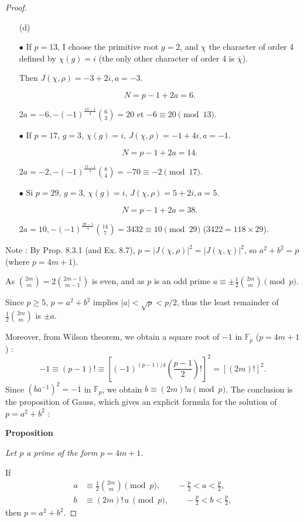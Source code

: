 \documentclass[11pt,a4paper]{article}
\newcommand{\F}{\mathbb{F}}
\begin{document}
{\begin{proof}
\begin{enumerate}
$$2a \equiv - (-1)^{\frac{p-1}{4}}\binom{\frac{p-1}{2}}{\frac{p-1}{4}}\ \pmod p.$$


\item[(d)] 

 $\bullet$ If $p=13$, I choose the primitive root $g = \overline{2}$, and $\chi$ the character of order 4 defined by $\chi(g) = i$ (the only other character of order 4 is $\overline{\chi}$).
 
Then $J(\chi,\rho) = -3+2i, a = -3$.

$$N=p-1+2a=6.$$

$2a=-6, -(-1)^{\frac{13-1}{4}} \binom{6}{3} = 20$ et $-6\equiv20\pmod {13}$.

$\bullet$ If $p=17$, $g = 3$,  $\chi(g) = i$, $J(\chi,\rho) = -1+4i, a=-1$.

$$N = p-1+2a = 14.$$

$2a=-2, -(-1)^{\frac{17-1}{4}} \binom{8}{4} =-70 \equiv -2\pmod{17}$.

$\bullet$ Si $p=29$, $g = 3$,  $\chi(g) = i$, $J(\chi,\rho) = 5+2i, a=5$.

$$N = p-1+2a = 38.$$

$2a=10, -(-1)^{\frac{29-1}{4}} \binom{14}{7} =3432 \equiv 10\pmod {29}$ ($3422 = 118\times 29$).

\end{enumerate}

\bigskip

Note : By Prop. 8.3.1 (and Ex. 8.7),  $ p = | J(\chi,\rho) |^2 = |J(\chi,\chi)|^2$, so $a^2 + b^2 = p$ (where $p = 4m+1$).

As $\binom{2m}{m} = 2 \binom{2m-1}{m-1}$ is even, and as $p$ is an odd prime $a \equiv \pm \frac{1}{2} \binom{2m}{m} \pmod p$.

Since $p\geq 5$, $p = a^2+b^2$ implies $|a| < \sqrt{p} < p/2$, thus the least remainder of $\frac{1}{2} \binom{2m}{m}$ is $\pm a$. 

Moreover, from Wilson theorem, we obtain a square root of $-1$ in $\F_p$ ($p = 4 m +1$) :
$$-1 \equiv (p-1)! \equiv \left[ (-1)^{(p-1)/4} \left( \frac{p-1}{2}\right)!\right]^2 = [(2m)!]^2.$$
Since $(\overline{b}\overline{a}^{-1})^2 = -\overline{1}$ in $\F_p$, we obtain $ b \equiv (2m)! a \pmod p$. The conclusion is the proposition of Gauss, which  gives an explicit formula for the solution of $p=a^2+b^2$ :

{\bf Proposition} {\it  Let $p$ a prime of the form $p=4m+1$.

If 
\begin{align*}
a &\equiv \frac{1}{2} \binom{2m}{m} \pmod p,\qquad -\frac{p}{2} < a < \frac{p}{2},\\
b &\equiv (2m)!\, a\ \pmod p,\qquad  -\frac{p}{2} < b < \frac{p}{2},
\end{align*}
then $p = a^2+b^2$.
}
\end{proof}

}
\end{document}

